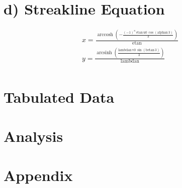 \message{ !name(HW3.tex)}\documentclass[12pt,letterpaper,notitlepage]{article}
\begin{document}
\section{d) Streakline Equation}
\begin{eqnarray}
x = \frac{\mathop{\mathrm{arccosh}}\nolimits\!\left(-\frac{{\left(- 1\right)}^n\, \mathrm{etan}\, \mathrm{u0}\, \cos\!\left(\mathrm{alphan}\, 3\right)}{3}\right)}{\mathrm{etan}}\\
y = \frac{\mathop{\mathrm{arcsinh}}\nolimits\!\left(\frac{\mathrm{lambdan}\, \mathrm{v0}\, \sin\!\left(\mathrm{betan}\, 3\right)}{3}\right)}{\mathrm{lambdan}}\\
\end{eqnarray}
\section{Tabulated Data}
\section{Analysis}
\section{Appendix}
\end{document}
